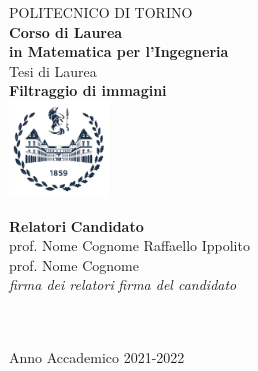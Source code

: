 \begin{titlepage}

\begin{center}

{\huge POLITECNICO DI TORINO}\\[1.5cm]
\textbf{Corso di Laurea\\in Matematica per l'Ingegneria}\\[3cm]

{\Large Tesi di Laurea}\\[1cm]
\textbf{\LARGE Filtraggio di immagini }\\[2cm]
\includegraphics[width=0.2\textwidth]{./Pictures/logo_polito_2021.jpg}
\vspace{4cm}


\begin{minipage}{0.85\textwidth}
\begin{flushleft}\large
\textbf{Relatori} \hfill \textbf{Candidato}\\
prof. Nome Cognome \hfill Raffaello Ippolito\\
prof. Nome Cognome \\
\textit{firma dei relatori} \hfill \textit{firma del candidato}\\[0.35cm]
\fillin\ \hfill \\
\fillin\ \hfill \fillin
\end{flushleft}
\end{minipage}

\vfill

Anno Accademico 2021-2022
\end{center}

\restoregeometry %

\end{titlepage}